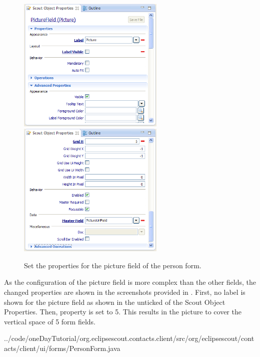 \documentclass[a4paper,10pt,twoside]{book}
\begin{document}
\begin{figure}
\includegraphics[width=7cm]{picture_field_properties_1.png} \hspace{5mm}
\includegraphics[width=7cm]{picture_field_properties_2.png}
\caption{Set the properties for the picture field of the person form.}
\end{figure}

As the configuration of the picture field is more complex than the other fields, the changed properties are shown in the screenshots provided in . 
First, no label is shown for the picture field as shown in the unticked  of the Scout Object Properties. 
Then, property  is set to 5. 
This results in the picture to cover the vertical space of 5 form fields. 


{../code/oneDayTutorial/org.eclipsescout.contacts.client/src/org/eclipsescout/contacts/client/ui/forms/PersonForm.java}
\end{document}
